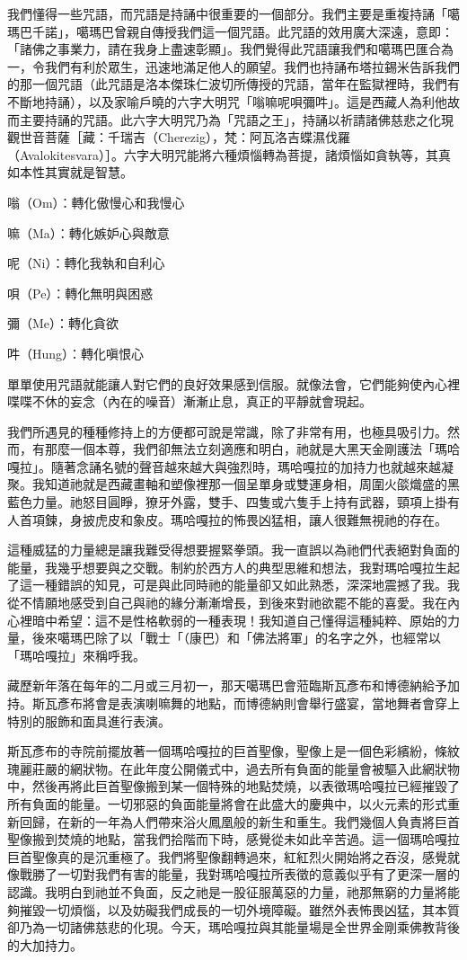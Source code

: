 我們懂得一些咒語，而咒語是持誦中很重要的一個部分。我們主要是重複持誦「噶瑪巴千諾」，噶瑪巴曾親自傳授我們這一個咒語。此咒語的效用廣大深遠，意即：「諸佛之事業力，請在我身上盡速彰顯」。我們覺得此咒語讓我們和噶瑪巴匯合為一，令我們有利於眾生，迅速地滿足他人的願望。我們也持誦布塔拉錫米告訴我們的那一個咒語（此咒語是洛本傑珠仁波切所傳授的咒語，當年在監獄裡時，我們有不斷地持誦），以及家喻戶曉的六字大明咒「嗡嘛呢唄彌吽」。這是西藏人為利他故而主要持誦的咒語。此六字大明咒乃為「咒語之王」，持誦以祈請諸佛慈悲之化現觀世音菩薩［藏：千瑞吉（Cherezig），梵：阿瓦洛吉蝶濕伐羅（Avalokitesvara）］。六字大明咒能將六種煩惱轉為菩提，諸煩惱如貪執等，其真如本性其實就是智慧。

嗡（Om）：轉化傲慢心和我慢心

嘛（Ma）：轉化嫉妒心與敵意

呢（Ni）：轉化我執和自利心

唄（Pe）：轉化無明與困惑

彌（Me）：轉化貪欲

吽（Hung）：轉化嗔恨心

單單使用咒語就能讓人對它們的良好效果感到信服。就像法會，它們能夠使內心裡喋喋不休的妄念（內在的噪音）漸漸止息，真正的平靜就會現起。

我們所遇見的種種修持上的方便都可說是常識，除了非常有用，也極具吸引力。然而，有那麼一個本尊，我們卻無法立刻適應和明白，祂就是大黑天金剛護法「瑪哈嘎拉」。隨著念誦名號的聲音越來越大與強烈時，瑪哈嘎拉的加持力也就越來越凝聚。我知道祂就是西藏畫軸和塑像裡那一個呈單身或雙運身相，周圍火燄熾盛的黑藍色力量。祂怒目圓睜，獠牙外露，雙手、四隻或六隻手上持有武器，頸項上掛有人首項鍊，身披虎皮和象皮。瑪哈嘎拉的怖畏凶猛相，讓人很難無視祂的存在。

這種威猛的力量總是讓我難受得想要握緊拳頭。我一直誤以為祂們代表絕對負面的能量，我幾乎想要與之交戰。制約於西方人的典型思維和想法，我對瑪哈嘎拉生起了這一種錯誤的知見，可是與此同時祂的能量卻又如此熟悉，深深地震撼了我。我從不情願地感受到自己與祂的緣分漸漸增長，到後來對祂欲罷不能的喜愛。我在內心裡暗中希望：這不是性格軟弱的一種表現！我知道自己懂得這種純粹、原始的力量，後來噶瑪巴除了以「戰士「（康巴）和「佛法將軍」的名字之外，也經常以「瑪哈嘎拉」來稱呼我。

藏歷新年落在每年的二月或三月初一，那天噶瑪巴會蒞臨斯瓦彥布和博德納給予加持。斯瓦彥布將會是表演喇嘛舞的地點，而博德納則會舉行盛宴，當地舞者會穿上特別的服飾和面具進行表演。

斯瓦彥布的寺院前擺放著一個瑪哈嘎拉的巨首聖像，聖像上是一個色彩繽紛，條紋瑰麗莊嚴的網狀物。在此年度公開儀式中，過去所有負面的能量會被驅入此網狀物中，然後再將此巨首聖像搬到某一個特殊的地點焚燒，以表徵瑪哈嘎拉已經摧毀了所有負面的能量。一切邪惡的負面能量將會在此盛大的慶典中，以火元素的形式重新回歸，在新的一年為人們帶來浴火鳳凰般的新生和重生。我們幾個人負責將巨首聖像搬到焚燒的地點，當我們拾階而下時，感覺從未如此辛苦過。這一個瑪哈嘎拉巨首聖像真的是沉重極了。我們將聖像翻轉過來，紅紅烈火開始將之吞沒，感覺就像戰勝了一切對我們有害的能量，我對瑪哈嘎拉所表徵的意義似乎有了更深一層的認識。我明白到祂並不負面，反之祂是一股征服萬惡的力量，祂那無窮的力量將能夠摧毀一切煩惱，以及妨礙我們成長的一切外境障礙。雖然外表怖畏凶猛，其本質卻乃為一切諸佛慈悲的化現。今天，瑪哈嘎拉與其能量場是全世界金剛乘佛教背後的大加持力。

